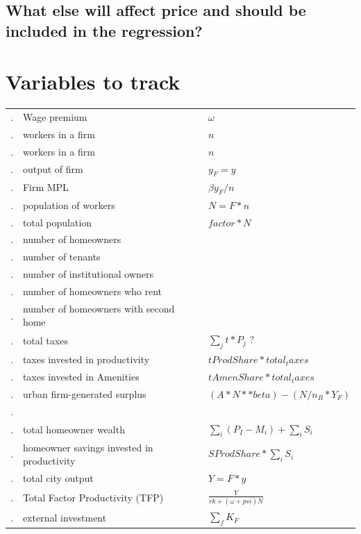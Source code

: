 \subsection{What else will affect price and should be included in the regression?}

\newcommand{\num}{\addtocounter{foo}{1}\thefoo. &}
\newcommand{\Rnum}{\addtocounter{foo}{1}\thefoo. &\vspace{-.3cm}\color{red} }
\section{Variables to track}

\begin{tabular}{lp{8cm}l}
\hline
\num Wage premium  &$\omega$\\
\num workers in a firm &$n$\\
\num workers in a firm &$n$\\
\num output of firm &$y_F=y$\\
\num Firm MPL& $\beta y_F/n$ \\ 
\num  population of workers &$N=F*n$\\
\num total population & $factor * N$\\

\hline
\num number of homeowners &\\
\num number of tenants &\\
\num number of institutional owners &\\
\num number of homeowners who rent&\\
\num number of homeowners with second home&\\


\hline
\num total taxes & $\sum_j t*P_j$ ?\\
\num taxes invested in productivity& $tProdShare * total_taxes$\\
\num taxes invested in Amenities& $tAmenShare * total_taxes$\\

\hline
\Rnum  urban firm-generated surplus &  $(A * N**beta) - (N/n_R * Y_F)$ \\
\num \\

\num total homeowner wealth& $\sum_i(P_I - M_i) + \sum_i S_i$\\
\num homeowner savings invested in productivity & $SProdShare * \sum_i S_i$\\
\num total city output& $Y=F*y$\\
\num  Total Factor Productivity (TFP)& $\frac{Y}{rk+(\omega+psi)N}$\\
\num external investment & $\sum_f K_F$\\
\hline
\end{tabular}

